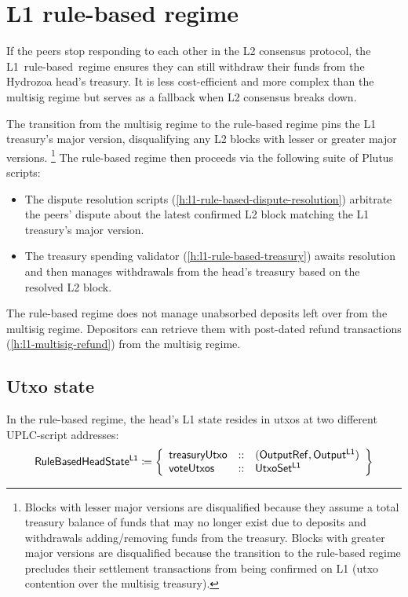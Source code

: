 \documentclass[../hydrozoa.tex]{subfiles}
\begin{document}
\chapter{L1 rule-based regime}%
\label{h:l1-rule-based-regime}%

If the peers stop responding to each other in the L2 consensus protocol, the L1~rule-based~regime ensures they can still withdraw their funds from the Hydrozoa head's treasury.
It is less cost-efficient and more complex than the multisig regime but serves as a fallback when L2 consensus breaks down.

The transition from the multisig regime to the rule-based regime pins the L1 treasury's major version, disqualifying any L2 blocks with lesser or greater major versions.%
\footnote{Blocks with lesser major versions are disqualified because they assume a total treasury balance of funds that may no longer exist due to deposits and withdrawals adding/removing funds from the treasury.
  Blocks with greater major versions are disqualified because the transition to the rule-based regime precludes their settlement transactions from being confirmed on L1 (utxo contention over the multisig treasury).}
The rule-based regime then proceeds via the following suite of Plutus scripts:
\begin{itemize}
  \item The dispute resolution scripts (\cref{h:l1-rule-based-dispute-resolution}) arbitrate the peers' dispute about the latest confirmed L2 block matching the L1 treasury's major version.
  \item The treasury spending validator (\cref{h:l1-rule-based-treasury}) awaits resolution and then manages withdrawals from the head's treasury based on the resolved L2 block.
\end{itemize}

The rule-based regime does not manage unabsorbed deposits left over from the multisig regime.
Depositors can retrieve them with post-dated refund transactions (\cref{h:l1-multisig-refund}) from the multisig regime.

\section{Utxo state}%
\label{h:l1-rule-based-utxo-state}%

In the rule-based regime, the head's L1 state resides in utxos at two different UPLC-script addresses:
\begin{equation*}
  \mathsf{RuleBasedHeadState^{L1}} \coloneq \left\{
  \begin{array}{lll}
    \mathsf{treasuryUtxo} &::& (\mathsf{OutputRef}, \mathsf{Output^{L1}}) \\
    \mathsf{voteUtxos} &::& \mathsf{UtxoSet^{L1}}
  \end{array}\right\}
\end{equation*}
\end{document}

